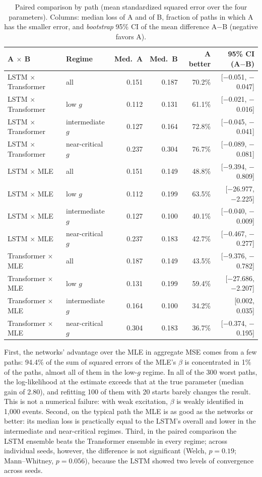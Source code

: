 \begin{table}[htbp]
\centering
\caption{Paired comparison by path (mean standardized squared error over
the four parameters). Columns: median loss of A and of B, fraction of paths
in which A has the smaller error, and \emph{bootstrap} 95\% CI of the mean
difference A$-$B (negative favors A).}
\label{tab:posthoc-pareado}
\footnotesize
\begin{tabular}{llrrrr}
\toprule
A $\times$ B & Regime & Med.\ A & Med.\ B & A better & 95\% CI (A$-$B)\\
\midrule
LSTM $\times$ Transformer & all & 0.151 & 0.187 & 70.2\% & [$-$0.051, $-$0.047]\\
LSTM $\times$ Transformer & low $g$ & 0.112 & 0.131 & 61.1\% & [$-$0.021, $-$0.016]\\
LSTM $\times$ Transformer & intermediate $g$ & 0.127 & 0.164 & 72.8\% & [$-$0.045, $-$0.041]\\
LSTM $\times$ Transformer & near-critical $g$ & 0.237 & 0.304 & 76.7\% & [$-$0.089, $-$0.081]\\
\midrule
LSTM $\times$ MLE & all & 0.151 & 0.149 & 48.8\% & [$-$9.394, $-$0.809]\\
LSTM $\times$ MLE & low $g$ & 0.112 & 0.199 & 63.5\% & [$-$26.977, $-$2.225]\\
LSTM $\times$ MLE & intermediate $g$ & 0.127 & 0.100 & 40.1\% & [$-$0.040, $-$0.009]\\
LSTM $\times$ MLE & near-critical $g$ & 0.237 & 0.183 & 42.7\% & [$-$0.467, $-$0.277]\\
\midrule
Transformer $\times$ MLE & all & 0.187 & 0.149 & 43.5\% & [$-$9.376, $-$0.782]\\
Transformer $\times$ MLE & low $g$ & 0.131 & 0.199 & 59.4\% & [$-$27.686, $-$2.207]\\
Transformer $\times$ MLE & intermediate $g$ & 0.164 & 0.100 & 34.2\% & [0.002, 0.035]\\
Transformer $\times$ MLE & near-critical $g$ & 0.304 & 0.183 & 36.7\% & [$-$0.374, $-$0.195]\\
\bottomrule
\end{tabular}
\end{table}

First, the networks' advantage
over the MLE in aggregate MSE comes from a few paths: 94.4\% of the sum
of squared errors of the MLE's $\beta$ is concentrated in 1\% of the paths,
almost all of them in the low-$g$ regime. In all of the 300 worst paths, the
log-likelihood at the estimate exceeds that at the true parameter (median gain
of 2.80), and refitting 100 of them with 20 starts barely changes
the result. This is not a numerical failure: with weak excitation, $\beta$ is
weakly identified in 1,000 events. Second, on the typical path the MLE is as
good as the networks or better: its median loss is practically equal to the
LSTM's overall and lower in the intermediate and near-critical regimes. Third,
in the paired comparison the LSTM ensemble beats the Transformer ensemble in
every regime; across individual seeds, however, the difference is not
significant (Welch, $p=0.19$; Mann--Whitney, $p=0.056$),
because the LSTM showed two levels of convergence across seeds.

